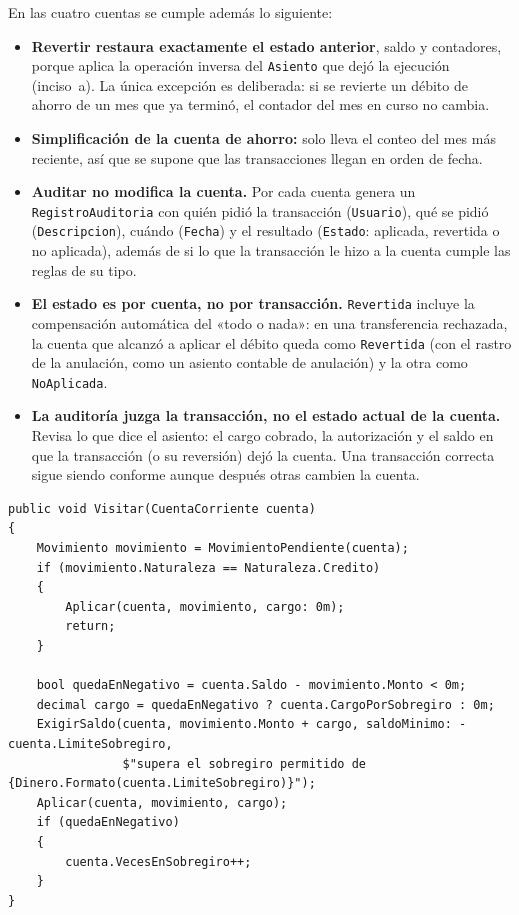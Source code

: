 En las cuatro cuentas se cumple además lo siguiente:
\begin{itemize}
  \item \textbf{Revertir restaura exactamente el estado anterior}, saldo y contadores, porque
        aplica la operación inversa del \texttt{Asiento} que dejó la ejecución (inciso~a). La
        única excepción es deliberada: si se revierte un débito de ahorro de un mes que ya
        terminó, el contador del mes en curso no cambia.
  \item \textbf{Simplificación de la cuenta de ahorro:} solo lleva el conteo del mes más
        reciente, así que se supone que las transacciones llegan en orden de fecha.
  \item \textbf{Auditar no modifica la cuenta.} Por cada cuenta genera un
        \texttt{RegistroAuditoria} con quién pidió la transacción (\texttt{Usuario}), qué se
        pidió (\texttt{Descripcion}), cuándo (\texttt{Fecha}) y el resultado
        (\texttt{Estado}: aplicada, revertida o no aplicada), además de si lo que la
        transacción le hizo a la cuenta cumple las reglas de su tipo.
  \item \textbf{El estado es por cuenta, no por transacción.} \texttt{Revertida} incluye la
        compensación automática del «todo o nada»: en una transferencia rechazada, la cuenta
        que alcanzó a aplicar el débito queda como \texttt{Revertida} (con el rastro de la
        anulación, como un asiento contable de anulación) y la otra como
        \texttt{NoAplicada}.
  \item \textbf{La auditoría juzga la transacción, no el estado actual de la cuenta.} Revisa
        lo que dice el asiento: el cargo cobrado, la autorización y el saldo en que la
        transacción (o su reversión) dejó la cuenta. Una transacción correcta sigue siendo
        conforme aunque después otras cambien la cuenta.
\end{itemize}

\begin{lstlisting}[basicstyle=\ttfamily\footnotesize, columns=fullflexible, keepspaces=true, caption={\texttt{EjecutarTransaccion} en una cuenta corriente.}]
public void Visitar(CuentaCorriente cuenta)
{
    Movimiento movimiento = MovimientoPendiente(cuenta);
    if (movimiento.Naturaleza == Naturaleza.Credito)
    {
        Aplicar(cuenta, movimiento, cargo: 0m);
        return;
    }

    bool quedaEnNegativo = cuenta.Saldo - movimiento.Monto < 0m;
    decimal cargo = quedaEnNegativo ? cuenta.CargoPorSobregiro : 0m;
    ExigirSaldo(cuenta, movimiento.Monto + cargo, saldoMinimo: -cuenta.LimiteSobregiro,
                $"supera el sobregiro permitido de {Dinero.Formato(cuenta.LimiteSobregiro)}");
    Aplicar(cuenta, movimiento, cargo);
    if (quedaEnNegativo)
    {
        cuenta.VecesEnSobregiro++;
    }
}
\end{lstlisting}

